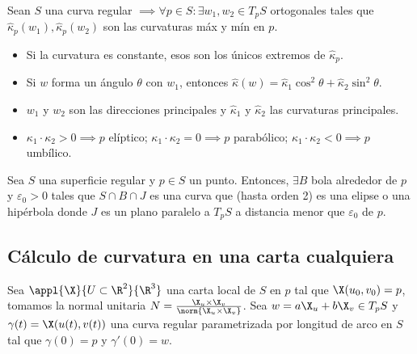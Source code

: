 \begin{teo}
	Sean $S$ una curva regular $\implies \forall p \in S : \exists {w_1}, {w_2} \in T_pS $ ortogonales tales que $ \hat{\kappa}_p(w_1), \hat{\kappa}_p(w_2)$ son las curvaturas máx y mín en $p$.
\end{teo}
\begin{obs}
	\begin{itemize}
		\item Si la curvatura es constante, esos son los únicos extremos de $\hat{\kappa}_p$.
		\item Si $w$ forma un ángulo $\theta$ con $w_1$, entonces $\hat{\kappa}(w) = \hat{\kappa}_1 \cos^2\theta + \hat{\kappa}_2\sin^2\theta$.
		\item $w_1$ y $w_2$ son las direcciones principales y $\hat{\kappa}_1$ y $\hat{\kappa}_2$ las curvaturas principales.
		\item $\kappa_1 \cdot \kappa_2 > 0 \implies p$ elíptico; $\kappa_1 \cdot \kappa_2 = 0 \implies p$ parabólico; $\kappa_1 \cdot \kappa_2 < 0 \implies p$ umbílico.
	\end{itemize}
\end{obs}

\begin{cor}
	Sea $S$ una superficie regular y $p\in S$ un punto. Entonces, $\exists B$ bola alrededor de $p$ y $\varepsilon_0 > 0$ tales que $S\cap B \cap J$ es una curva que (hasta orden 2) es una elipse o una hipérbola donde $J$ es un plano paralelo a $T_pS$ a distancia menor que $\varepsilon_0$ de $p$.
\end{cor}

\subsection{Cálculo de curvatura en una carta cualquiera}

Sea $\appl{\X}{U\subset\R^2}{\R^3}$ una carta local de $S$ en $p$ tal que $\X(u_0, v_0) = p$, tomamos la normal unitaria $N = \frac{\X_u \times \X_v}{\norm{\X_u \times \X_v}}$. Sea $w = a\X_u + b\X_v \in T_pS$ y $\gamma(t) = \X(u(t), v(t))$ una curva regular parametrizada por longitud de arco en $S$ tal que $\gamma(0) = p$ y $\gamma'(0) = w$.
